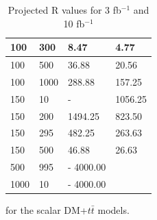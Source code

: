 \begin{table}[h]
\begin{tabular}{llll}
100     & 300     & 8.47    & 4.77 \\ \hline
100     & 500     & 36.88   & 20.56 \\ \hline
100     & 1000    & 288.88  & 157.25 \\ \hline 
150     & 10      & -       & 1056.25 \\ \hline
150     & 200     & 1494.25 & 823.50 \\ \hline
150     & 295     & 482.25  & 263.63 \\ \hline
150     & 500     & 46.88   & 26.63 \\ \hline
500     & 995     & -       4000.00 \\ \hline
1000    & 10      & -       4000.00 \\ \hline
\end{tabular}
\caption{Projected R values for 3 fb$^{-1}$ and 10 fb$^{-1}$} for the scalar  DM+$t\bar{t}$ models.
\label{tab:dmtt_S_R_values}
\end{table}


